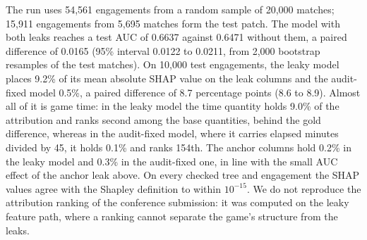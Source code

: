 The run uses 54,561 engagements from a random sample of 20,000 matches; 15,911 engagements from 5,695
matches form the test patch. The model with both leaks reaches a test AUC of 0.6637 against 0.6471
without them, a paired difference of 0.0165 (95\% interval 0.0122 to 0.0211, from 2,000 bootstrap
resamples of the test matches). On 10,000 test engagements, the leaky model places 9.2\% of its mean
absolute SHAP value on the leak columns and the audit-fixed model 0.5\%, a paired difference of 8.7
percentage points (8.6 to 8.9). Almost all of it is game time: in the leaky model the time quantity
holds 9.0\% of the attribution and ranks second among the base quantities, behind the gold difference,
whereas in the audit-fixed model, where it carries elapsed minutes divided by 45, it holds 0.1\% and
ranks 154th. The anchor columns hold 0.2\% in the leaky model and 0.3\% in the audit-fixed one, in line
with the small AUC effect of the anchor leak above. On every checked tree and engagement the SHAP values
agree with the Shapley definition to within $10^{-15}$. We do not
reproduce the attribution ranking of the conference submission: it was computed on the leaky feature path,
where a ranking cannot separate the game's structure from the leaks.

